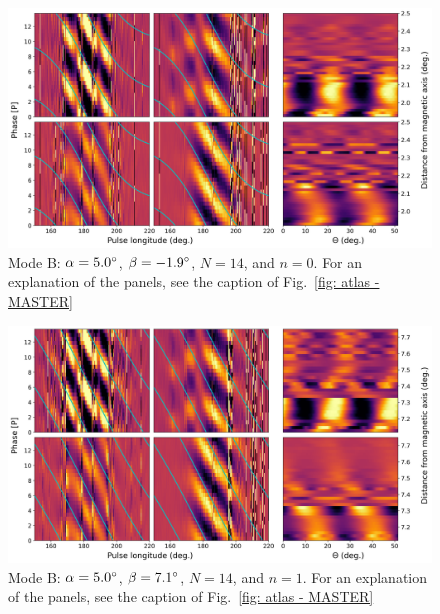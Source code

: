 \begin{figure}
	\begin{center}
		\includegraphics[width=\atlasHeightFrac\textwidth]{Figures/B0031/atlas/B_517005014000_plots}
		\caption[Atlas results: Mode B -- $\alpha=5.0\degr$, $\beta=-1.9\degr$, $N=14$, $n=0$]{Mode B: $\alpha=5.0\degr$, $\beta=-1.9\degr$, $N=14$, and $n=0$. For an explanation of the panels, see the caption of Fig.~\ref{fig: atlas - MASTER} }
		\label{fig: atlas - B_517005014000}
	\end{center}
\end{figure}

\begin{figure}
	\begin{center}
		\includegraphics[width=\atlasHeightFrac\textwidth]{Figures/B0031/atlas/B_517005014001_plots}
		\caption[Atlas results: Mode B -- $\alpha=5.0\degr$, $\beta=7.1\degr$, $N=14$, $n=1$]{Mode B: $\alpha=5.0\degr$, $\beta=7.1\degr$, $N=14$, and $n=1$. For an explanation of the panels, see the caption of Fig.~\ref{fig: atlas - MASTER} }
		\label{fig: atlas - B_517005014001}
	\end{center}
\end{figure}

